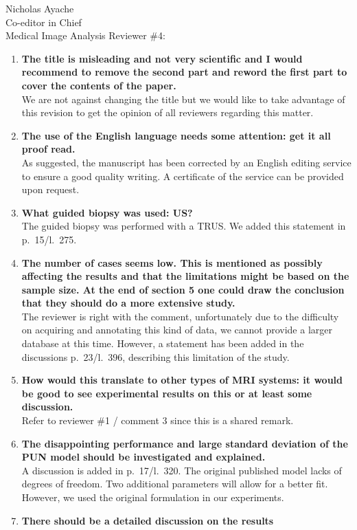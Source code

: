 \documentclass{letter}
\begin{document}
\begin{letter}{Nicholas Ayache \\ Co-editor in Chief \\ Medical Image Analysis}
  Reviewer \#4:
  \begin{enumerate}
  \item \textbf{The title is misleading and not very scientific and I
      would recommend to remove the second part and reword the first
      part to cover the contents of the paper.}\\
    We are not against changing the title but we would like to take
    advantage of this revision to get the opinion of all reviewers
    regarding this matter.
  \item \textbf{The use of the English language needs some attention:
      get it all proof read.}\\
    As suggested, the manuscript has been corrected by an English editing
    service to ensure a good quality writing. A certificate of the
    service can be provided upon request.
  \item \textbf{What guided biopsy was used: US?}\\
    The guided biopsy was performed with a TRUS. We added this
    statement in p.~15/l.~275.
  \item \textbf{The number of cases seems low. This is mentioned as
      possibly affecting the results and that the limitations might be
      based on the sample size. At the end of section 5 one could draw
      the conclusion that they should do a more extensive study.}\\
    The reviewer is right with the comment, unfortunately due to the
    difficulty on acquiring and annotating this kind of data, we
    cannot provide a larger database at this time. However, a
    statement has been added in the discussions p.~23/l.~396,
    describing this limitation of the study.
  \item \textbf{How would this translate to other types of MRI
      systems: it would be good to see experimental results on this or
      at least some discussion.}\\
    Refer to reviewer \#1 / comment 3 since this is a shared remark.
  \item \textbf{The disappointing performance and large standard
      deviation of the PUN model should be investigated and
      explained.}\\
    A discussion is added in p.~17/l.~320. The original published
    model lacks of
    degrees of freedom. Two additional parameters will
    allow for a better fit. However, we used the original formulation
    in our experiments.
  \item \textbf{There should be a detailed discussion on the results
}
\end{enumerate}
\end{letter}
\end{document}
